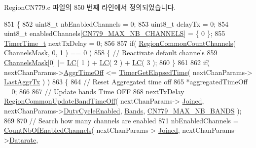 Region\+C\+N779.\+c 파일의 850 번째 라인에서 정의되었습니다.


\begin{DoxyCode}
851 \{
852     uint8\_t nbEnabledChannels = 0;
853     uint8\_t delayTx = 0;
854     uint8\_t enabledChannels[\mbox{\hyperlink{group___r_e_g_i_o_n_c_n779_gaa23230e648a8147840e88f03f9d3b7fc}{CN779\_MAX\_NB\_CHANNELS}}] = \{ 0 \};
855     \mbox{\hyperlink{utilities_8h_a4215ca43d3e953099ea758ce428599d0}{TimerTime\_t}} nextTxDelay = 0;
856 
857     \textcolor{keywordflow}{if}( \mbox{\hyperlink{group___r_e_g_i_o_n_c_o_m_m_o_n_gac23f0831812f610f57f42f6cf87368c9}{RegionCommonCountChannels}}( \mbox{\hyperlink{_region_c_n779_8c_a2188957b5ca6af8092154d7ccbfa5757}{ChannelsMask}}, 0, 1 ) == 0 )
858     \{ \textcolor{comment}{// Reactivate default channels}
859         \mbox{\hyperlink{_region_c_n779_8c_a2188957b5ca6af8092154d7ccbfa5757}{ChannelsMask}}[0] |= \mbox{\hyperlink{group___r_e_g_i_o_n_ga12fa17e5c1016e01a9d82c25027deb1b}{LC}}( 1 ) + \mbox{\hyperlink{group___r_e_g_i_o_n_ga12fa17e5c1016e01a9d82c25027deb1b}{LC}}( 2 ) + \mbox{\hyperlink{group___r_e_g_i_o_n_ga12fa17e5c1016e01a9d82c25027deb1b}{LC}}( 3 );
860     \}
861 
862     \textcolor{keywordflow}{if}( nextChanParams->\mbox{\hyperlink{structs_next_chan_params_a3609676d2d3b7c00e25615324b35cb26}{AggrTimeOff}} <= \mbox{\hyperlink{time_server_8c_a9ca7e27f3d6474daff63f2e093a2e91e}{TimerGetElapsedTime}}( nextChanParams->
      \mbox{\hyperlink{structs_next_chan_params_a381b728f60b185ecf3313e974c18768b}{LastAggrTx}} ) )
863     \{
864         \textcolor{comment}{// Reset Aggregated time off}
865         *aggregatedTimeOff = 0;
866 
867         \textcolor{comment}{// Update bands Time OFF}
868         nextTxDelay = \mbox{\hyperlink{group___r_e_g_i_o_n_c_o_m_m_o_n_ga2e26fe6b49ca26edf7052eadd7f18b3a}{RegionCommonUpdateBandTimeOff}}( nextChanParams->
      \mbox{\hyperlink{structs_next_chan_params_ac2f6caa0f3b02d2ac5056c3ee7c22652}{Joined}}, nextChanParams->\mbox{\hyperlink{structs_next_chan_params_a4d755868e0e80089462286c3ba6a6f18}{DutyCycleEnabled}}, \mbox{\hyperlink{_region_c_n779_8c_af0fa082231b29a5cac086386277e6ecc}{Bands}}, 
      \mbox{\hyperlink{group___r_e_g_i_o_n_c_n779_ga605a78b9ce2c56ef5d320e029e369236}{CN779\_MAX\_NB\_BANDS}} );
869 
870         \textcolor{comment}{// Search how many channels are enabled}
871         nbEnabledChannels = \mbox{\hyperlink{_region_c_n779_8c_a84ed01aa0ea6f1e53707efb5aaa3bd97}{CountNbOfEnabledChannels}}( nextChanParams->
      \mbox{\hyperlink{structs_next_chan_params_ac2f6caa0f3b02d2ac5056c3ee7c22652}{Joined}}, nextChanParams->\mbox{\hyperlink{structs_next_chan_params_ae2f6080f3aa0e9485c55513ca56bb24d}{Datarate}},

\end{DoxyCode}
